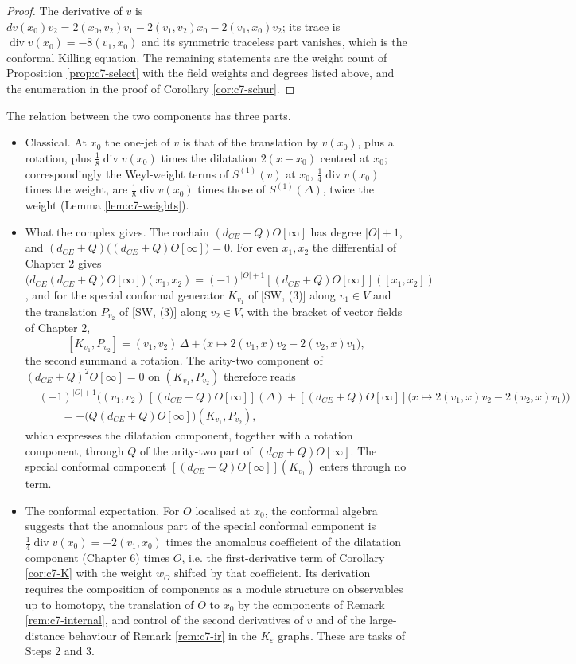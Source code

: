 \begin{proof}
The derivative of $v$ is $dv(x_0)v_2=2(x_0,v_2)v_1-2(v_1,v_2)x_0-2(v_1,x_0)v_2$; its trace is $\operatorname{div}v(x_0)=-8(v_1,x_0)$ and its symmetric traceless part vanishes, which is the conformal Killing equation. The remaining statements are the weight count of Proposition \ref{prop:c7-select} with the field weights and degrees listed above, and the enumeration in the proof of Corollary \ref{cor:c7-schur}.
\end{proof}

\begin{remark}
\label{rem:c7-KDelta}
The relation between the two components has three parts.
\begin{itemize}
\item Classical. At $x_0$ the one-jet of $v$ is that of the translation by $v(x_0)$, plus a rotation, plus $\tfrac18\operatorname{div}v(x_0)$ times the dilatation $2(x-x_0)$ centred at $x_0$; correspondingly the Weyl-weight terms of $S^{(1)}(v)$ at $x_0$, $\tfrac14\operatorname{div}v(x_0)$ times the weight, are $\tfrac18\operatorname{div}v(x_0)$ times those of $S^{(1)}(\Delta)$, twice the weight (Lemma \ref{lem:c7-weights}).
\item What the complex gives. The cochain $(d_{CE}+Q)O[\infty]$ has degree $|O|+1$, and $(d_{CE}+Q)\big((d_{CE}+Q)O[\infty]\big)=0$. For even $x_1,x_2$ the differential of Chapter 2 gives $\big(d_{CE}(d_{CE}+Q)O[\infty]\big)(x_1,x_2)=(-1)^{|O|+1}[(d_{CE}+Q)O[\infty]]([x_1,x_2])$, and for the special conformal generator $K_{v_1}$ of [SW, (3)] along $v_1\in V$ and the translation $P_{v_2}$ of [SW, (3)] along $v_2\in V$, with the bracket of vector fields of Chapter 2,
\[
[K_{v_1},P_{v_2}]=(v_1,v_2)\,\Delta+\big(x\mapsto2(v_1,x)v_2-2(v_2,x)v_1\big),
\]
the second summand a rotation. The arity-two component of $(d_{CE}+Q)^2O[\infty]=0$ on $(K_{v_1},P_{v_2})$ therefore reads
\[
\begin{aligned}
&(-1)^{|O|+1}\Big((v_1,v_2)\,[(d_{CE}+Q)O[\infty]](\Delta)+[(d_{CE}+Q)O[\infty]]\big(x\mapsto2(v_1,x)v_2-2(v_2,x)v_1\big)\Big)\\
&\qquad=-\big(Q(d_{CE}+Q)O[\infty]\big)(K_{v_1},P_{v_2}),
\end{aligned}
\]
which expresses the dilatation component, together with a rotation component, through $Q$ of the arity-two part of $(d_{CE}+Q)O[\infty]$. The special conformal component $[(d_{CE}+Q)O[\infty]](K_{v_1})$ enters through no term.
\item The conformal expectation. For $O$ localised at $x_0$, the conformal algebra suggests that the anomalous part of the special conformal component is $\tfrac14\operatorname{div}v(x_0)=-2(v_1,x_0)$ times the anomalous coefficient of the dilatation component (Chapter 6) times $O$, i.e. the first-derivative term of Corollary \ref{cor:c7-K} with the weight $w_O$ shifted by that coefficient. Its derivation requires the composition of components as a module structure on observables up to homotopy, the translation of $O$ to $x_0$ by the components of Remark \ref{rem:c7-internal}, and control of the second derivatives of $v$ and of the large-distance behaviour of Remark \ref{rem:c7-ir} in the $K_\varepsilon$ graphs. These are tasks of Steps 2 and 3.

\end{itemize}
\end{remark}
